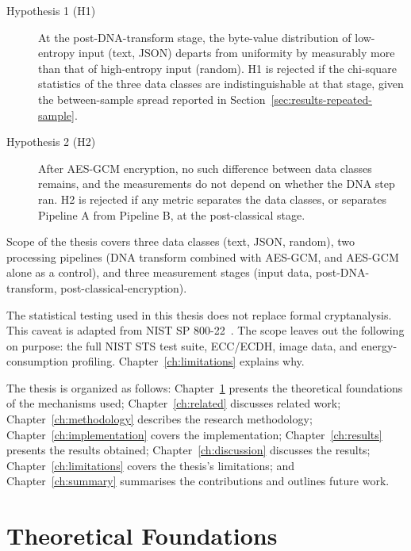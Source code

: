 \documentclass[12pt,a4paper,twoside]{report}
\numberwithin{equation}{chapter}
\begin{document}
\begin{description}
\item[Hypothesis 1 (H1)] At the post-DNA-transform stage, the byte-value distribution
of low-entropy input (text, JSON) departs from uniformity by
measurably more than that of high-entropy input (random). H1 is
rejected if the chi-square statistics of the three data classes are
indistinguishable at that stage, given the between-sample spread
reported in Section~\ref{sec:results-repeated-sample}.

\item[Hypothesis 2 (H2)] After AES-GCM encryption, no such difference between data
classes remains, and the measurements do not depend on whether the DNA
step ran. H2 is rejected if any metric separates the data classes, or
separates Pipeline A from Pipeline B, at the post-classical stage.
\end{description}

Scope of the thesis covers three data classes (text, JSON,
random), two processing pipelines (DNA transform combined with AES-GCM,
and AES-GCM alone as a control), and three measurement stages (input
data, post-DNA-transform, post-classical-encryption).

The statistical testing used in this thesis does not replace formal
cryptanalysis. This caveat is adapted from NIST SP 800-22~\cite{nist80022}.
The scope leaves out the following on purpose: the full NIST STS test
suite, ECC/ECDH, image data, and energy-consumption profiling.
Chapter~\ref{ch:limitations} explains why.

The thesis is organized as follows: Chapter~\ref{ch:foundations}
presents the theoretical foundations of the mechanisms used;
Chapter~\ref{ch:related} discusses related work;
Chapter~\ref{ch:methodology} describes the research methodology;
Chapter~\ref{ch:implementation} covers the implementation;
Chapter~\ref{ch:results} presents the results obtained;
Chapter~\ref{ch:discussion} discusses the results;
Chapter~\ref{ch:limitations} covers the thesis's limitations; and
Chapter~\ref{ch:summary} summarises the contributions and outlines
future work.

\chapter{Theoretical Foundations}
\label{ch:foundations}
\end{document}
